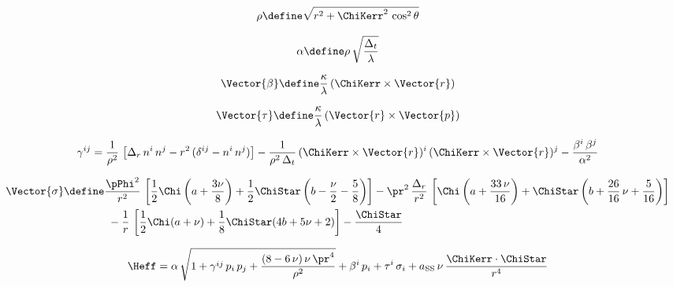 \documentclass[twoside, aps, prd, letterpaper, noshowpacs, %
amsmath, amssymb, amsfonts, nofootinbib, floatfix, notitlepage]%
{revtex4-1}
\begin{document}
\begin{equation}
  \label{eq:rho}
  \rho \define \sqrt{r^{2} + \ChiKerr^{2}\, \cos^{2} \theta}
\end{equation}

\begin{equation}
  \label{eq:alpha}
  \alpha \define \rho\, \sqrt{ \frac{\Delta_{t}} {\lambda} }
\end{equation}

\begin{equation}
  \label{eq:beta}
  \Vector{\beta} \define \frac{\kappa} {\lambda}\, (\ChiKerr \times \Vector{r})
\end{equation}

\begin{equation}
  \label{eq:tau}
  \Vector{\tau} \define \frac{\kappa} {\lambda}\, (\Vector{r} \times
  \Vector{p})
\end{equation}

\begin{equation}
  \label{eq:gamma}
  \gamma^{ij} = \frac{1}{\rho^{2}}\, \left[ \Delta_{r}\, n^{i}\, n^{j}
    - r^{2}\, (\delta^{ij} - n^{i}\, n^{j}) \right] - \frac{1}
  {\rho^{2}\, \Delta_{t}}\, (\ChiKerr \times \Vector{r})^{i}\,
  (\ChiKerr \times \Vector{r})^{j} - \frac{\beta^{i}\, \beta^{j}}
  {\alpha^{2}}
\end{equation}

\begin{equation}
  \label{eq:sigma}
  \begin{split}
    \Vector{\sigma} &\define \frac{\pPhi^2} {r^2}\, \left[\frac{1}{2}
      \Chi \left(a + \frac{3 \nu} {8} \right) + \frac{1}{2} \ChiStar
      \left( b - \frac{\nu}{2} - \frac{5} {8} \right) \right] -
    \pr^2\, \frac{\Delta_{r}} {r^{2}}\, \left[ \Chi \left( a +
        \frac{33\, \nu} {16} \right) + \ChiStar \left( b + \frac{26}
        {16}\, \nu + \frac{5} {16} \right) \right]
    \\
    &\phantom{\define~} - \frac{1} {r}\, \left[\frac{1}{2} \Chi
      (a+\nu) + \frac{1}{8} \ChiStar (4 b + 5 \nu + 2) \right] -
    \frac{\ChiStar} {4}
  \end{split}
\end{equation}

\begin{equation}
  \label{eq:HeffSpin}
  \Heff = \alpha\, \sqrt{1 + \gamma^{ij}\, p_{i}\, p_{j} +
    \frac{(8-6\, \nu)\, \nu\, \pr^{4}} {\rho^{2}}} + \beta^{i}\, p_{i} +
  \tau^{i}\, \sigma_{i} + a_{\text{SS}}\, \nu\, \frac{\ChiKerr \cdot
    \ChiStar} {r^{4}}
\end{equation}
\end{document}
